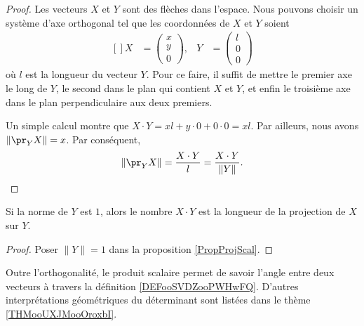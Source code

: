 \begin{proof}
	Les vecteurs $X$ et $Y$ sont des flèches dans l'espace. Nous pouvons choisir un système d'axe orthogonal tel que les coordonnées de $X$ et $Y$ soient
	\begin{equation}
		\begin{aligned}[]
			X&=\begin{pmatrix}
				x	\\ 
				y	\\ 
				0	
			\end{pmatrix},
			&Y&=\begin{pmatrix}
				l	\\ 
				0	\\ 
				0	
			\end{pmatrix}
		\end{aligned}
	\end{equation}
	où $l$ est la longueur du vecteur $Y$. Pour ce faire, il suffit de mettre le premier axe le long de $Y$, le second dans le plan qui contient $X$ et $Y$, et enfin le troisième axe dans le plan perpendiculaire aux deux premiers.

	Un simple calcul montre que $X\cdot Y=xl+y\cdot 0+0\cdot 0=xl$. Par ailleurs, nous avons $\| \pr_YX \|=x$. Par conséquent,
	\begin{equation}
		\| \pr_YX \|=\frac{ X\cdot Y }{ l }=\frac{ X\cdot Y }{ \| Y \| }.
	\end{equation}
\end{proof}

\begin{corollary}
	Si la norme de $Y$ est $1$, alors le nombre $X\cdot Y$ est la longueur de la projection de $X$ sur $Y$.
\end{corollary}

\begin{proof}
	Poser $\| Y \|=1$ dans la proposition \ref{PropProjScal}.
\end{proof}

\begin{remark}
    Outre l'orthogonalité, le produit scalaire permet de savoir l'angle entre deux vecteurs à travers la définition \ref{DEFooSVDZooPWHwFQ}. D'autres interprétations géométriques du déterminant sont listées dans le thème \ref{THMooUXJMooOroxbI}.
\end{remark}

